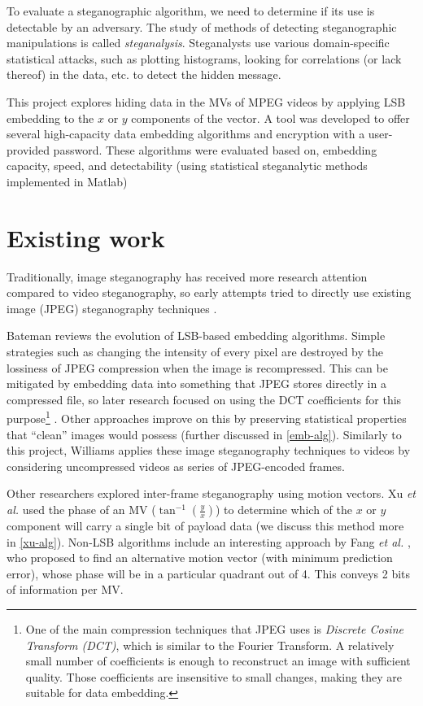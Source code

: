 \documentclass[12pt,british,twoside,notitlepage,usenames,dvipsnames,hypens,final]{report}
\numberwithin{equation}{section}
\numberwithin{figure}{section}
\begin{document}
To evaluate a steganographic algorithm, we need to determine if its use is detectable by an adversary. The study of methods of detecting steganographic manipulations is called \emph{steganalysis}. Steganalysts use various domain-specific statistical attacks, such as plotting histograms, looking for correlations (or lack thereof) in the data, etc. to detect the hidden message.

This project explores hiding data in the MVs of MPEG videos by applying LSB embedding to the $x$ or $y$ components of the vector. A tool was developed to offer several high-capacity data embedding algorithms and encryption with a user-provided password. These algorithms were evaluated based on, embedding capacity, speed, and detectability (using statistical steganalytic methods implemented in Matlab) 

\section{Existing work}

Traditionally, image steganography has received more research attention compared to video steganography, so early attempts tried to directly use existing image (JPEG) steganography techniques \cite{bateman, jpegdctcoding}.

Bateman \cite{bateman} reviews the evolution of LSB-based embedding algorithms. Simple strategies such as changing the intensity of every pixel are destroyed by the lossiness of JPEG compression when the image is recompressed. This can be mitigated by embedding data into something that JPEG stores directly in a compressed file, so later research focused on using the DCT coefficients for this purpose\footnote{
One of the main compression techniques that JPEG uses is \emph{Discrete Cosine Transform (DCT)}, which is similar to the Fourier Transform. A relatively small number of coefficients is enough to reconstruct an image with sufficient quality. Those coefficients are insensitive to small changes, making they are suitable for data embedding.} \cite{jpegdctcoding}. Other approaches improve on this by preserving statistical properties that ``clean'' images would possess \cite{bateman, f5} (further discussed in \ref{emb-alg}). Similarly to this project, Williams \cite{scott-fs} applies these image steganography techniques to videos by considering uncompressed videos as series of JPEG-encoded frames.

Other researchers explored inter-frame steganography using motion vectors. Xu \emph{et al.} \cite{xu2006steganography} used the phase of an MV ($\tan^{-1}(\frac{y}{x})$) to determine which of the $x$ or $y$ component will carry a single bit of payload data (we discuss this method more in \ref{xu-alg}). Non-LSB algorithms include an interesting approach by Fang \emph{et al.} \cite{fang2006data}, who proposed to find an alternative motion vector (with minimum prediction error), whose phase will be in a particular quadrant out of 4. This conveys 2 bits of information per MV.
\end{document}
